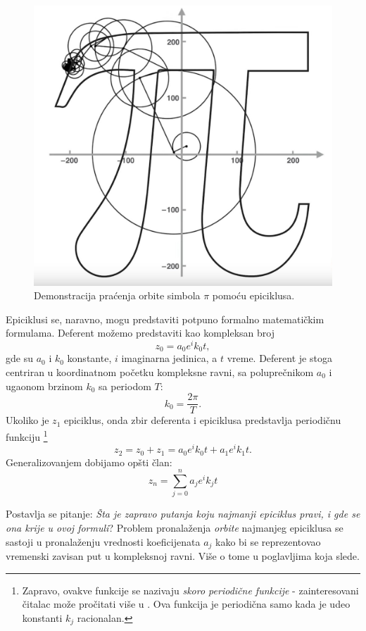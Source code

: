 \begin{figure}
    \centering
    \includegraphics[scale=0.2]{images/pi.jpg}
    \caption{Demonstracija pra\'c{}enja orbite simbola $\pi$ pomo\'c{}u epiciklusa.}
    \label{img:pi}
\end{figure}

Epiciklusi se, naravno, mogu predstaviti potpuno formalno matemati\v{c}kim formulama. Deferent mo\v{z}emo predstaviti kao kompleksan broj
$$z_0 = a_0e^ik_0t,$$
gde su $a_0$ i $k_0$ konstante, $i$ imaginarna jedinica, a $t$ vreme. Deferent je stoga centriran u koordinatnom po\v{c}etku kompleksne ravni, sa polupre\v{c}nikom $a_0$ i ugaonom brzinom $k_0$ sa periodom $T$:
$$k_0 = \frac{2\pi}{T}.$$ 
Ukoliko je $z_1$ epiciklus, onda zbir deferenta i epiciklusa predstavlja periodi\v{c}nu funkciju \footnote{Zapravo, ovakve funkcije se nazivaju \emph{skoro periodi\v{c}ne funkcije} - zainteresovani \v{c}italac mo\v{z}e pro\v{c}itati vi\v{s}e u \cite{AlmostPeriodicFunctions}. Ova funkcija je periodi\v{c}na samo kada je udeo konstanti $k_j$ racionalan.}
$$z_2 = z_0 + z_1 = a_0e^ik_0t + a_1e^ik_1t.$$
Generalizovanjem dobijamo op\v{s}ti \v{c}lan:
$$z_n = \sum_{j=0}^{n}{a_je^ik_jt}$$

Postavlja se pitanje: \textit{\v{S}ta je zapravo putanja koju najmanji epiciklus pravi, i gde se ona krije u ovoj formuli}? Problem pronala\v{z}enja \emph{orbite} najmanjeg epiciklusa se sastoji u pronala\v{z}enju vrednosti koeficijenata $a_j$ kako bi se reprezentovao vremenski zavisan put u kompleksnoj ravni. Vi\v{s}e o tome u poglavljima koja slede.